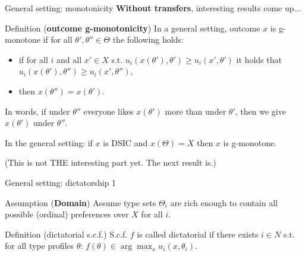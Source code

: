 \documentclass[english,10pt
,aspectratio=169
]{beamer}
\begin{document}
\begin{frame}{General setting: monotonicity}
	\textbf{Without transfers}, interesting results come up... 
	\begin{exampleblock}{Definition (\textbf{outcome g-monotonicity})}
		In a general setting, outcome $x$ is \alert{g-monotone} if for all $\theta',\theta'' \in \Theta$ the following holds:
		\begin{itemize}
			\item if for all $i$ and all $x' \in X$ s.t. $u_i(x(\theta'),\theta') \geq u_i(x',\theta')$ it holds that $u_i(x(\theta'),\theta'') \geq u_i(x',\theta'')$,
			\item then $x(\theta'')=x(\theta')$.
		\end{itemize}
	\end{exampleblock}
	In words, if under $\theta''$ everyone likes $x(\theta')$ more than under $\theta'$, then we give $x(\theta')$ under $\theta''$.
	\begin{theorem}
		In the general setting: if $x$ is DSIC and $x(\Theta)=X$ then $x$ is g-monotone.
	\end{theorem}
	(This is not THE interesting part yet. The next result is.)
\end{frame}


\begin{frame}{General setting: dictatorship 1}
	\begin{exampleblock}{Assumption (\textbf{Domain})}
		Assume type sets $\Theta_i$ are rich enough to contain all possible (ordinal) preferences over $X$ for all $i$.
	\end{exampleblock}
	\begin{exampleblock}{Definition (dictatorial s.c.f.)}
		S.c.f. $f$ is called \alert{dictatorial} if there exists $i \in N$ s.t. for all type profiles $\theta$:
	$ f(\theta) \in \arg \max_x u_i(x,\theta_i).$
	\end{exampleblock}
\end{frame}
\end{document}
